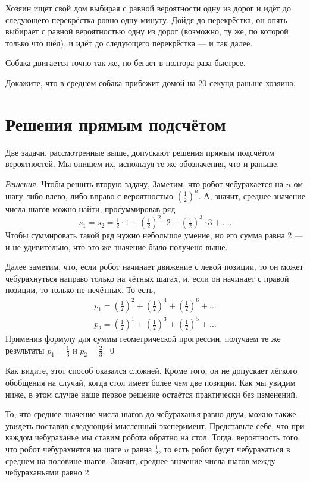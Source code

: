 \documentclass{article}
\begin{document}
Хозяин ищет свой дом выбирая с равной вероятности 
одну из дорог и идёт до следующего перекрёстка ровно одну минуту.
Дойдя до перекрёстка, он опять выбирает с равной вероятностью 
одну из дорог (возможно, ту же, по которой только что шёл), 
и идёт до следующего перекрёстка --- и так далее.

Собака двигается точно так же, но бегает в полтора раза быстрее.

Докажите, что в среднем собака прибежит домой на 20 секунд раньше хозяина.

\section{Решения прямым подсчётом}

Две задачи, рассмотренные выше, допускают решения прямым подсчётом вероятностей. 
Мы опишем их, используя те же обозначения, что и раньше.

\medskip
\noindent\textit{Решения.}
Чтобы решить вторую задачу, 
Заметим, что робот чебурахается на $n$-ом шагу либо влево, либо вправо с вероятностью $(\tfrac12)^n$.
А, значит, среднее значение числа шагов можно найти, просуммировав ряд
\[s_1=s_2=\tfrac12\cdot1+(\tfrac12)^2\cdot 2+(\tfrac12)^3\cdot 3+\dots.\]
Чтобы суммировать такой ряд нужно небольшое умение, 
но его сумма равна $2$ --- и не удивительно, что это же значение было получено выше.

Далее заметим, что, если робот начинает движение с левой позиции, 
то он может чебурахнуться направо только на чётных шагах, 
и, если он начинает с правой позиции, то только не нечётных.
То есть,
\begin{align*}
p_1=(\tfrac12)^2+(\tfrac12)^4+(\tfrac12)^6+\dots
\\
p_2=(\tfrac12)^1+(\tfrac12)^3+(\tfrac12)^5+\dots
\end{align*}
Применив формулу для суммы геометрической прогрессии, получаем те же результаты $p_1=\tfrac13$ и $p_2=\tfrac23$.
\qed
\medskip

Как видите, этот способ оказался сложней.
Кроме того, он не допускает лёгкого обобщения на случай, когда стол имеет более чем две позиции.
Как мы увидим ниже, в этом случае наше первое решение остаётся практически без изменений.

То, что среднее значение числа шагов до чебураханья
равно двум, можно также увидеть поставив следующий мысленный эксперимент.
Представьте себе, что при каждом чебураханье мы ставим робота обратно на стол.
Тогда, вероятность того, что робот чебурахнется на шаге $n$
равна $\tfrac12$,
то есть робот будет чебурахаться в среднем на половине шагов.
Значит, среднее значение числа шагов между чебураханьями равно 2.
\end{document}
